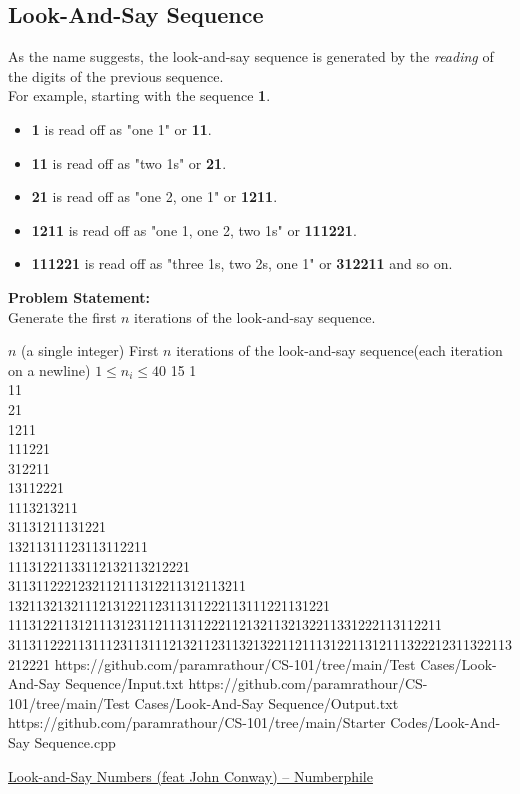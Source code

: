 \subsection{Look-And-Say Sequence}
As the name suggests, the look-and-say sequence is generated by the \emph{reading} of the digits of the previous sequence.\\%
For example, starting with the sequence \textbf{1}.
\begin{itemize}
\item \textbf{1} is read off as "one 1" or \textbf{11}.
\item \textbf{11} is read off as "two 1s" or \textbf{21}.
\item \textbf{21} is read off as "one 2, one 1" or \textbf{1211}.
\item \textbf{1211} is read off as "one 1, one 2, two 1s" or \textbf{111221}.
\item \textbf{111221} is read off as "three 1s, two 2s, one 1" or \textbf{312211} and so on.
\end{itemize}
\textbf{Problem Statement:}\\
Generate the first $n$ iterations of the look-and-say sequence.
\begin{testcasesMore}
	{$n$ \hfill(a single integer)}
	{First $n$ iterations of the look-and-say sequence\hfill(each iteration on a newline)}
	{$1 \leq n_i \leq 40$}
	{15}
	{1\\[0.5em]11\\[0.5em]21\\[0.5em]1211\\[0.5em]111221\\[0.5em]312211\\[0.5em]13112221\\[0.5em]1113213211\\[0.5em]31131211131221\\[0.5em]13211311123113112211\\[0.5em]11131221133112132113212221\\[0.5em]3113112221232112111312211312113211\\[0.5em]1321132132111213122112311311222113111221131221\\[0.5em]11131221131211131231121113112221121321132132211331222113112211\\[0.5em]311311222113111231131112132112311321322112111312211312111322212311322113212221}
	{https://github.com/paramrathour/CS-101/tree/main/Test Cases/Look-And-Say Sequence/Input.txt}
	{https://github.com/paramrathour/CS-101/tree/main/Test Cases/Look-And-Say Sequence/Output.txt}
	{https://github.com/paramrathour/CS-101/tree/main/Starter Codes/Look-And-Say Sequence.cpp}
\end{testcasesMore}
\begin{funvideo}
	\href{https://youtu.be/ea7lJkEhytA}{Look-and-Say Numbers (feat John Conway) -- Numberphile}
\end{funvideo}
\recalctypearea
